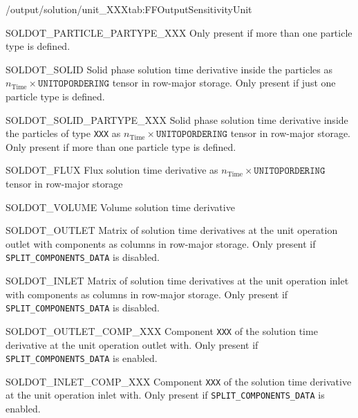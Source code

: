 \begin{groupscope}{/output/solution/unit\_XXX}{tab:FFOutputSensitivityUnit}
\begin{dataset}[type=double,unit={\si{\mol\per\cubic\metre\of{MP}\per\second}}]{SOLDOT\_PARTICLE\_PARTYPE\_XXX}
    Only present if more than one particle type is defined.
  \end{dataset}
  \begin{dataset}[type=double,unit={\si{\mol\per\cubic\metre\of{MP}\per\second}}]{SOLDOT\_SOLID}
    Solid phase solution time derivative inside the particles as $n_{\text{Time}} \times \texttt{UNITOPORDERING}$ tensor in row-major storage.
    Only present if just one particle type is defined.
  \end{dataset}
  \begin{dataset}[type=double,unit={\si{\mol\per\cubic\metre\of{SP}\per\second}}]{SOLDOT\_SOLID\_PARTYPE\_XXX}
    Solid phase solution time derivative inside the particles of type \texttt{XXX} as $n_{\text{Time}} \times \texttt{UNITOPORDERING}$ tensor in row-major storage.
    Only present if more than one particle type is defined.
  \end{dataset}
  \begin{dataset}[type=double,unit={\si{\mol\per\square\metre\per\square\second}}]{SOLDOT\_FLUX}
    Flux solution time derivative as $n_{\text{Time}} \times \texttt{UNITOPORDERING}$ tensor in row-major storage
  \end{dataset}
  \begin{dataset}[type=double,unit={\si{\cubic\metre\per\second}}]{SOLDOT\_VOLUME}
    Volume solution time derivative 
  \end{dataset}
  \begin{dataset}[type=double,unit={\si{\mol\per\cubic\metre\of{IV}\per\second}}]{SOLDOT\_OUTLET}
    Matrix of solution time derivatives at the unit operation outlet with components as columns in row-major storage.
    Only present if \texttt{SPLIT\_COMPONENTS\_DATA} is disabled.
  \end{dataset}
  \begin{dataset}[type=double,unit={\si{\mol\per\cubic\metre\of{IV}\per\second}}]{SOLDOT\_INLET}
    Matrix of solution time derivatives at the unit operation inlet with components as columns in row-major storage.
    Only present if \texttt{SPLIT\_COMPONENTS\_DATA} is disabled.
  \end{dataset}
  \begin{dataset}[type=double,unit={\si{\mol\per\cubic\metre\of{IV}\per\second}}]{SOLDOT\_OUTLET\_COMP\_XXX}
    Component \texttt{XXX} of the solution time derivative at the unit operation outlet with.
    Only present if \texttt{SPLIT\_COMPONENTS\_DATA} is enabled.
  \end{dataset}
  \begin{dataset}[type=double,unit={\si{\mol\per\cubic\metre\of{IV}\per\second}}]{SOLDOT\_INLET\_COMP\_XXX}
    Component \texttt{XXX} of the solution time derivative at the unit operation inlet with.
    Only present if \texttt{SPLIT\_COMPONENTS\_DATA} is enabled.
  \end{dataset}
\end{groupscope}

